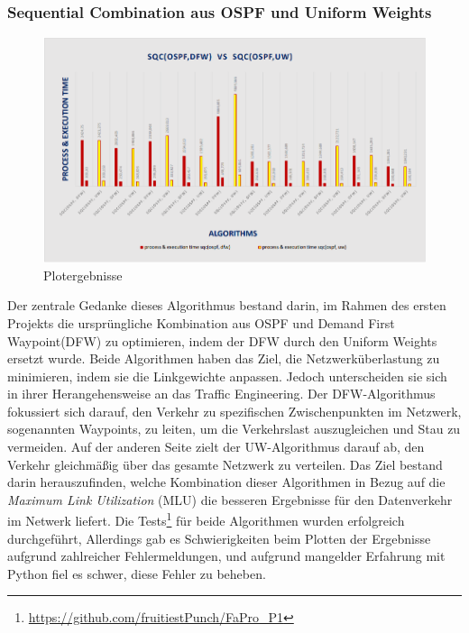 \documentclass[sigconf, nonacm, review]{acmart}
\begin{document}
\subsubsection{Sequential Combination aus OSPF und Uniform Weights}
\begin{figure}
\centering
\includegraphics[width=\linewidth]{figures/naveed_p1.png}
\caption{Plotergebnisse}
\label{fig:naveed_p1}
\end{figure}
Der zentrale Gedanke dieses  Algorithmus bestand darin, 
im Rahmen des ersten Projekts die urspr\"ungliche Kombination aus OSPF und Demand First Waypoint(DFW)  zu optimieren, 
indem der DFW durch den Uniform Weights ersetzt wurde. 
Beide Algorithmen haben das Ziel, die Netzwerk\"uberlastung zu minimieren, indem sie die Linkgewichte anpassen. 
Jedoch unterscheiden sie sich in ihrer Herangehensweise an das Traffic Engineering.\newline
Der DFW-Algorithmus fokussiert sich darauf, den Verkehr zu spezifischen Zwischenpunkten im Netzwerk, 
sogenannten Waypoints, zu leiten, um die Verkehrslast auszugleichen und Stau zu vermeiden. 
Auf der anderen Seite zielt der UW-Algorithmus darauf ab, den Verkehr gleichm\"a\ss ig \"uber das gesamte Netzwerk zu verteilen.\newline
Das Ziel bestand darin herauszufinden, 
welche Kombination dieser Algorithmen in Bezug auf die \emph{Maximum Link Utilization} (MLU) die besseren Ergebnisse f\"ur den Datenverkehr im Netwerk liefert.\newline
Die Tests\footnote{\url{https://github.com/fruitiestPunch/FaPro\_P1}} f\"ur beide Algorithmen wurden erfolgreich durchgef\"uhrt, Allerdings gab es Schwierigkeiten beim Plotten der Ergebnisse aufgrund zahlreicher Fehlermeldungen, 
und aufgrund mangelder Erfahrung mit Python fiel es schwer, diese Fehler zu beheben.\newline
\end{document}
